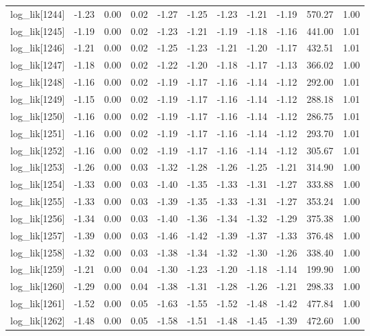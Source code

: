 \begin{table}[ht]
\begin{tabular}{rrrrrrrrrrr}
  log\_lik[1244] & -1.23 & 0.00 & 0.02 & -1.27 & -1.25 & -1.23 & -1.21 & -1.19 & 570.27 & 1.00 \\ 
  log\_lik[1245] & -1.19 & 0.00 & 0.02 & -1.23 & -1.21 & -1.19 & -1.18 & -1.16 & 441.00 & 1.01 \\ 
  log\_lik[1246] & -1.21 & 0.00 & 0.02 & -1.25 & -1.23 & -1.21 & -1.20 & -1.17 & 432.51 & 1.01 \\ 
  log\_lik[1247] & -1.18 & 0.00 & 0.02 & -1.22 & -1.20 & -1.18 & -1.17 & -1.13 & 366.02 & 1.00 \\ 
  log\_lik[1248] & -1.16 & 0.00 & 0.02 & -1.19 & -1.17 & -1.16 & -1.14 & -1.12 & 292.00 & 1.01 \\ 
  log\_lik[1249] & -1.15 & 0.00 & 0.02 & -1.19 & -1.17 & -1.16 & -1.14 & -1.12 & 288.18 & 1.01 \\ 
  log\_lik[1250] & -1.16 & 0.00 & 0.02 & -1.19 & -1.17 & -1.16 & -1.14 & -1.12 & 286.75 & 1.01 \\ 
  log\_lik[1251] & -1.16 & 0.00 & 0.02 & -1.19 & -1.17 & -1.16 & -1.14 & -1.12 & 293.70 & 1.01 \\ 
  log\_lik[1252] & -1.16 & 0.00 & 0.02 & -1.19 & -1.17 & -1.16 & -1.14 & -1.12 & 305.67 & 1.01 \\ 
  log\_lik[1253] & -1.26 & 0.00 & 0.03 & -1.32 & -1.28 & -1.26 & -1.25 & -1.21 & 314.90 & 1.00 \\ 
  log\_lik[1254] & -1.33 & 0.00 & 0.03 & -1.40 & -1.35 & -1.33 & -1.31 & -1.27 & 333.88 & 1.00 \\ 
  log\_lik[1255] & -1.33 & 0.00 & 0.03 & -1.39 & -1.35 & -1.33 & -1.31 & -1.27 & 353.24 & 1.00 \\ 
  log\_lik[1256] & -1.34 & 0.00 & 0.03 & -1.40 & -1.36 & -1.34 & -1.32 & -1.29 & 375.38 & 1.00 \\ 
  log\_lik[1257] & -1.39 & 0.00 & 0.03 & -1.46 & -1.42 & -1.39 & -1.37 & -1.33 & 376.48 & 1.00 \\ 
  log\_lik[1258] & -1.32 & 0.00 & 0.03 & -1.38 & -1.34 & -1.32 & -1.30 & -1.26 & 338.40 & 1.00 \\ 
  log\_lik[1259] & -1.21 & 0.00 & 0.04 & -1.30 & -1.23 & -1.20 & -1.18 & -1.14 & 199.90 & 1.00 \\ 
  log\_lik[1260] & -1.29 & 0.00 & 0.04 & -1.38 & -1.31 & -1.28 & -1.26 & -1.21 & 298.33 & 1.00 \\ 
  log\_lik[1261] & -1.52 & 0.00 & 0.05 & -1.63 & -1.55 & -1.52 & -1.48 & -1.42 & 477.84 & 1.00 \\ 
  log\_lik[1262] & -1.48 & 0.00 & 0.05 & -1.58 & -1.51 & -1.48 & -1.45 & -1.39 & 472.60 & 1.00 \\ 

\end{tabular}
\end{table}
